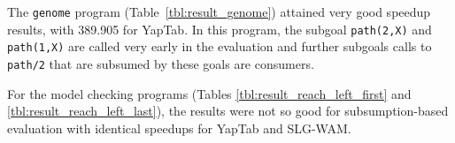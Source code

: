The \texttt{genome} program (Table~\ref{tbl:result_genome}) attained very good speedup results, with
389.905 for YapTab. In this program, the subgoal \texttt{path(2,X)} and \texttt{path(1,X)} are called
very early in the evaluation and further subgoals calls to \texttt{path/2} that are subsumed by these
goals are consumers.

For the model checking programs (Tables \ref{tbl:result_reach_left_first} and \ref{tbl:result_reach_left_last}),
the results were not so good for subsumption-based evaluation with identical speedups for YapTab and SLG-WAM.




